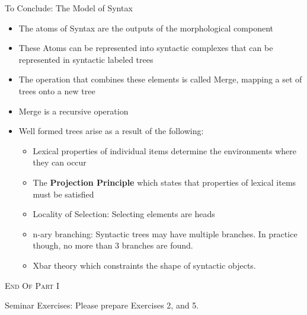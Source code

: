 \begin{frame}
  {To Conclude:  The Model of Syntax}
  \begin{itemize}
  \item The atoms of Syntax are the outputs of the morphological component
  \item These Atoms can be represented into syntactic complexes that can be represented in syntactic labeled trees
  \item The operation that combines these elements is called Merge, mapping a set of trees onto a new tree
  \item Merge is a recursive operation
  \item Well formed trees arise as a result of the following:
    \begin{itemize}
    \item Lexical properties of individual items determine the environments where they can occur
    \item The \textbf{Projection Principle} which states that properties of lexical items must be satisfied
    \item Locality of Selection:  Selecting elements are heads
    \item n-ary branching:  Syntactic trees may have multiple branches.  In practice though, no more than 3 branches are found.
    \item Xbar theory which constraints the shape of syntactic objects. 
    \end{itemize}
  \end{itemize}

\end{frame}

\begin{frame}
  \begin{center}
    E\textsc{nd} O\textsc{f} P\textsc{art} I
  \end{center}
\end{frame}



Seminar Exercises:  Please prepare Exercises 2, and 5. 




